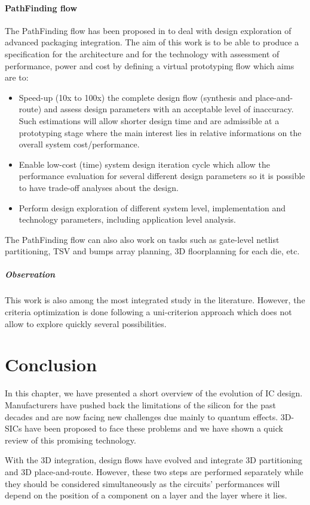 \paragraph{PathFinding flow}
The PathFinding flow has been proposed in \cite{5335663,DBLP:conf/3dic/MilojevicCCRRSAPM09} to deal with design exploration of advanced packaging integration. The aim of this work is to be able to produce a specification for the architecture and for the technology with assessment of performance, power and cost by defining a virtual prototyping flow which aims are to:
\begin{itemize}
\item Speed-up (10x to 100x) the complete design flow (synthesis and place-and-route) and assess design parameters with an acceptable level of inaccuracy. Such estimations will allow shorter design time and are admissible at a prototyping stage where the main interest lies in relative informations on the overall system cost/performance.
\item Enable low-cost (time) system design iteration cycle which allow the performance evaluation for several different design parameters so it is possible to have trade-off analyses about the design.
\item Perform design exploration of different system level, implementation and technology parameters, including application level analysis.
\end{itemize}
The PathFinding flow can also also work on tasks such as gate-level netlist partitioning, TSV and bumps array planning, 3D floorplanning for each die, etc.

\subparagraph{Observation}
This work is also among the most integrated study in the literature. However, the criteria optimization is done following a uni-criterion approach which does not allow to explore quickly several possibilities.

\section{Conclusion}
In this chapter, we have presented a short overview of the evolution of IC design. Manufacturers have pushed back the limitations of the silicon for the past decades and are now facing new challenges due mainly to quantum effects. 3D-SICs have been proposed to face these problems and we have shown a quick review of this promising technology.

With the 3D integration, design flows have evolved and integrate 3D partitioning and 3D place-and-route. However, these two steps are performed separately while they should be considered simultaneously as the circuits' performances will depend on the position of a component on a layer and the layer where it lies.


